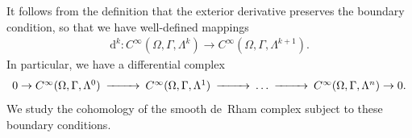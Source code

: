 \documentclass[10pt,a4paper]{amsart}
\theoremstyle{definition}
\theoremstyle{remark}
\numberwithin{equation}{section}
\newcommand{\cartan}{{\mathrm d}}
\newcommand{\Domain}{{\Omega}}
\newcommand{\Alt}[1]{\Lambda^{#1}}
\begin{document}
It follows from the definition that the exterior derivative preserves the boundary condition, so that we have well-defined mappings 
\begin{align*}
    \cartan^{k} : C^{\infty}(\Domain,\Gamma,\Alt{k}) \to C^{\infty}(\Domain,\Gamma,\Alt{k+1})
    .
\end{align*}
In particular, we have a differential complex 
\begin{align}\label{math:relative-smooth-homology:complex-on-domain}
    \begin{CD}
        0 \to 
        C^{\infty}(\Domain,\Gamma,\Alt{0}) 
        @>>> 
        C^{\infty}(\Domain,\Gamma,\Alt{1}) 
        @>>> 
        \dots
        @>>> 
        C^{\infty}(\Domain,\Gamma,\Alt{n})
        \to 0.
    \end{CD}
\end{align}
We study the cohomology of the smooth de~Rham complex subject to these boundary conditions.
\end{document}
